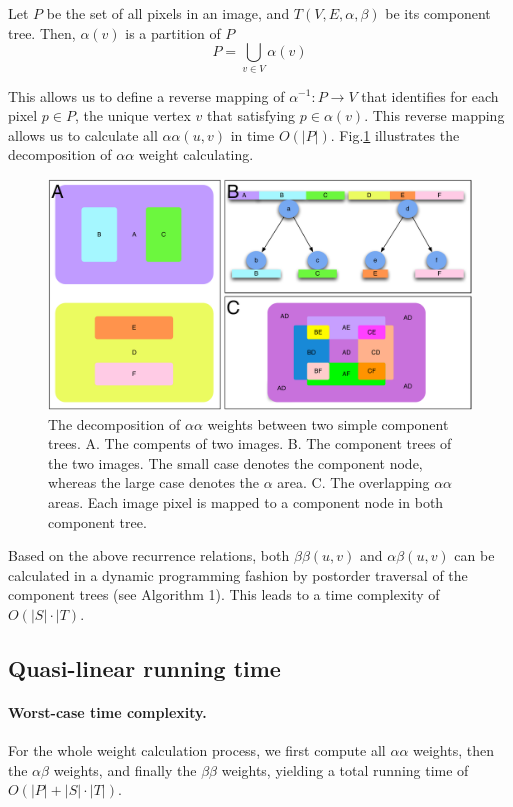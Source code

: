 Let $P$ be the set of all pixels in an image, and $T(V,E,\alpha,\beta)$
be its component tree. Then, $\alpha(v)$ is a partition of $P$
\begin{equation} \label{eqn:alpha-decompose}
P = \bigcup_{v \in V}\alpha(v)
\end{equation}

This allows us to define a reverse mapping of $\alpha^{-1}: P \to V$ that
identifies for each pixel $p\in P$, the unique vertex $v$ that satisfying
$p\in\alpha(v)$.  This reverse mapping allows us to calculate all
$\alpha\alpha(u,v)$ in time $O(|P|)$. Fig.\ref{fig:cptree-aaweight} illustrates
the decomposition of $\alpha\alpha$ weight calculating.

\begin{figure}[htbp]
\centering
\includegraphics[width=1.0\textwidth]{images/cptree_aaweight}
\caption{The decomposition of $\alpha\alpha$ weights between two simple component
trees. A. The compents of two images. B. The component trees of the two images. 
The small case denotes the component node, whereas the large case denotes the $\alpha$
area. C. The overlapping $\alpha\alpha$ areas. Each image pixel is mapped to a 
component node in both component tree.}
\label{fig:cptree-aaweight}
\end{figure}

Based on the above recurrence relations, both $\beta\beta(u,v)$ and
$\alpha\beta(u,v)$ can be calculated in a dynamic programming fashion by
postorder traversal of the component trees (see Algorithm 1). This leads to a
time complexity of $O(|S| \cdot |T)$.  

\subsection{Quasi-linear running time}
\paragraph{Worst-case time complexity.} For the whole weight calculation
process, we first compute all $\alpha\alpha$ weights, then the
$\alpha\beta$ weights, and finally the $\beta\beta$ weights, yielding
a total running time of $O(|P| + |S|\cdot|T|)$.  

